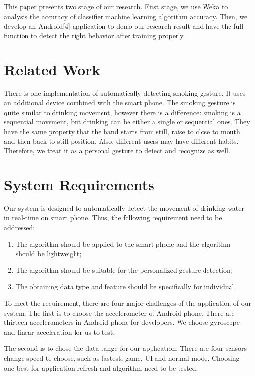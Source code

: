 \documentclass[12pt,twocolumn]{article}
\begin{document}
This paper presents two stage of our research. First stage, we use Weka\cite{Weka} to analysis the accuracy of classifier machine learning algorithm accuracy. Then, we develop an Android[4] application to demo our research result and have the full function to detect the right behavior after training properly.

\section{Related Work}
There is one implementation of automatically detecting smoking gesture\cite{Parate:2014:RRS:2594368.2594379}. It uses an additional device combined with the smart phone. The smoking gesture is quite similar to drinking movement, however there is a difference: smoking is a sequential movement, but drinking can be either a single or sequential ones. They have the same property that the hand starts from still, raise to close to mouth and then back to still position. Also, different users may have different habits. Therefore, we treat it as a personal gesture to detect and recognize as well.

\section{System Requirements}
Our system is designed to automatically detect the movement of drinking water in real-time on smart phone. Thus, the following requirement need to be addressed:

\begin{enumerate}
	\item The algorithm should be applied to the smart phone and the algorithm should be lightweight;
	\item The algorithm should be suitable for the personalized gesture detection;
	\item The obtaining data type and feature should be specifically for individual.
\end{enumerate}

To meet the requirement, there are four major challenges of the application of our system. The first is to choose the accelerometer of Android phone. There are thirteen accelerometers\cite{androidsensor} in Android phone for developers. We choose gyroscope and linear acceleration for us to test.

The second is to chose the data range for our application. There are four sensors change speed to choose, such as fastest, game, UI and normal mode\cite{androidsensor}. Choosing one best for application refresh and algorithm need to be tested.
 
\end{document}
